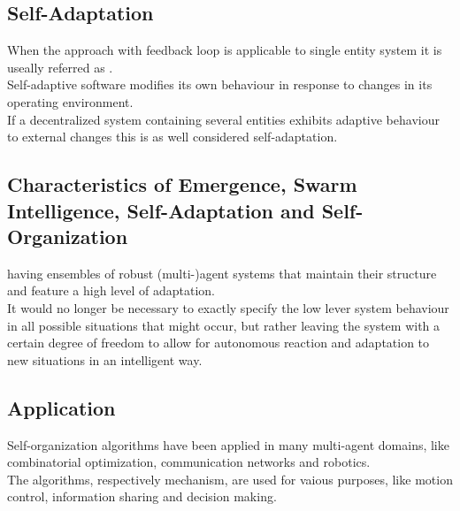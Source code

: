 \subsection{Self-Adaptation}
When the approach with feedback loop is applicable to single entity system it is useally referred as .\\
Self-adaptive software modifies its own behaviour in response to changes in its operating environment.\\
If a decentralized system containing several entities exhibits adaptive behaviour to external changes this is as well considered self-adaptation.

\subsection{Characteristics of Emergence, Swarm Intelligence, Self-Adaptation and Self-Organization}
having ensembles of robust (multi-)agent systems that maintain their structure and feature a high level of adaptation.\\
It would no longer be necessary to exactly specify the low lever system behaviour in all possible situations that might occur, but rather leaving the system with a certain degree of freedom to allow for autonomous reaction and adaptation to new situations in an intelligent way.

\subsection{Application}
Self-organization algorithms have been applied in many multi-agent domains, like combinatorial optimization, communication networks and robotics.\\
The algorithms, respectively mechanism, are used for vaious purposes, like motion control, information sharing and decision making.
